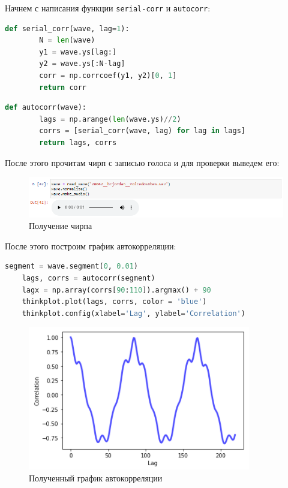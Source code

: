 \documentclass[a4paper]{article}
\begin{document}
            Начнем с написания функции \texttt{serial-corr} и \texttt{autocorr}:
            
\begin{lstlisting}[language=Python, caption= Функция \texttt{serial-corr}]
    def serial_corr(wave, lag=1):
        N = len(wave)
        y1 = wave.ys[lag:]
        y2 = wave.ys[:N-lag]
        corr = np.corrcoef(y1, y2)[0, 1]
        return corr
\end{lstlisting}      

\begin{lstlisting}[language=Python, caption= Функция \texttt{autocorr}]
    def autocorr(wave):
        lags = np.arange(len(wave.ys)//2)
        corrs = [serial_corr(wave, lag) for lag in lags]
        return lags, corrs
\end{lstlisting} 
           
           После этого прочитам чирп с записью голоса и для проверки выведем его:
           
            \begin{figure}[H]
                \centering
                \includegraphics[width=\textwidth]{ex_1_audio.png}
                \caption{Получение чирпа}
                \label{fig:ex_1_audio}
            \end{figure}
           
           После этого построим график автокорреляции:
           
\begin{lstlisting}[language=Python, caption= Построение графика автокорреляции]
    segment = wave.segment(0, 0.01)
    lags, corrs = autocorr(segment)
    lagx = np.array(corrs[90:110]).argmax() + 90
    thinkplot.plot(lags, corrs, color = 'blue')
    thinkplot.config(xlabel='Lag', ylabel='Correlation')
\end{lstlisting}               
            
            \begin{figure}[H]
                \centering
                \includegraphics{ex_1_segment.png}
                \caption{Полученный график автокорреляции}
                \label{fig:ex_1_segment}
            \end{figure}
            
\end{document}
